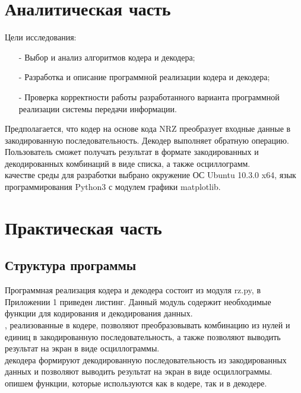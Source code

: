 \documentclass[a4paper14pt]{article}
\begin{document}
\newpage

\section{Аналитическая часть}
Цели исследования:
\begin{itemize}
    \item[-]Выбор и анализ алгоритмов кодера и декодера;
    \item[-]Разработка и описание программной реализации кодера и декодера;
    \item[-]Проверка корректности работы разработанного варианта
программной реализации системы передачи информации.
\end{itemize}
Предполагается, что кодер на основе кода NRZ преобразует входные данные в закодированную последовательность. Декодер выполняет обратную операцию. Пользователь сможет получать результат в формате закодированных и декодированных комбинаций в виде списка, а также осциллограмм.\\
 качестве среды для разработки выбрано окружение ОС Ubuntu 10.3.0 x64, язык программирования Python3 с модулем графики matplotlib.

\newpage
\section{Практическая часть}
\subsection{Структура программы}
Программная реализация кодера и декодера состоит из модуля rz.py, в Приложении 1 приведен листинг. Данный модуль содержит необходимые функции для кодирования и декодирования данных.\\
, реализованные в кодере, позволяют преобразовывать комбинацию из нулей и единиц в закодированную последовательность, а также позволяют выводить результат на экран в виде осциллограммы.\\
 декодера формируют декодированную последовательность из закодированных данных и позволяют выводить результат на экран в виде осциллограммы.\\
 опишем функции, которые используются как в кодере, так и в декодере.\\
\end{document}
